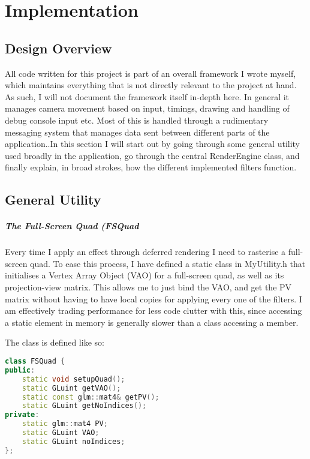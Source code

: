 \chapter{Implementation}
\section{Design Overview}
All code written for this project is part of an overall framework I wrote myself, which maintains everything that is not directly relevant to the project at hand. As such, I will not document the framework itself in-depth here. In general it manages camera movement based on input, timings, drawing and handling of debug console input etc. Most of this is handled through a rudimentary messaging system that manages data sent between different parts of the application..In this section I will start out by going through some general utility used broadly in the application, go through the central RenderEngine class, and finally explain, in broad strokes, how the different implemented filters function.

\section{General Utility}

\paragraph{The Full-Screen Quad (FSQuad}
Every time I apply an effect through deferred rendering I need to rasterise a full-screen quad. To ease this process, I have defined a static class in MyUtility.h that initialises a Vertex Array Object (VAO) for a full-screen quad, as well as its projection-view matrix. This allows me to just bind the VAO, and get the PV matrix without having to have local copies for applying every one of the filters. I am effectively trading performance for less code clutter with this, since accessing a static element in memory is generally slower than a class accessing a member.

The class is defined like so:
\begin{lstlisting}[caption={MyUtility.h},language=c++]
class FSQuad {
public:
    static void setupQuad();
    static GLuint getVAO();
    static const glm::mat4& getPV();
    static GLuint getNoIndices();
private:
    static glm::mat4 PV;
    static GLuint VAO;
    static GLuint noIndices;
};
\end{lstlisting}

